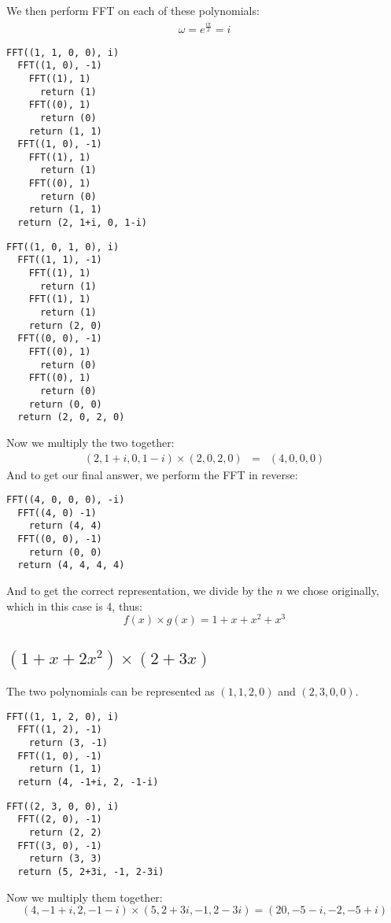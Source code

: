 \documentclass[11pt]{article}
\begin{document}
We then perform FFT on each of these polynomials:
\begin{eqnarray*}
\omega = e^{\frac{i\pi}{2}} = i
\end{eqnarray*}
\begin{verbatim}
FFT((1, 1, 0, 0), i)
  FFT((1, 0), -1)
    FFT((1), 1)
      return (1)
    FFT((0), 1)
      return (0)
    return (1, 1)
  FFT((1, 0), -1)
    FFT((1), 1)
      return (1)
    FFT((0), 1)
      return (0)
    return (1, 1)
  return (2, 1+i, 0, 1-i)
\end{verbatim}
\begin{verbatim}
FFT((1, 0, 1, 0), i)
  FFT((1, 1), -1)
    FFT((1), 1)
      return (1)
    FFT((1), 1)
      return (1)
    return (2, 0)
  FFT((0, 0), -1)
    FFT((0), 1)
      return (0)
    FFT((0), 1)
      return (0)
    return (0, 0)
  return (2, 0, 2, 0)
\end{verbatim}
Now we multiply the two together:
\begin{eqnarray*}
(2, 1+i, 0, 1-i) \times (2, 0, 2, 0) &=& (4, 0, 0, 0)
\end{eqnarray*}
And to get our final answer, we perform the FFT in reverse:
\begin{verbatim}
FFT((4, 0, 0, 0), -i)
  FFT((4, 0) -1)
    return (4, 4)
  FFT((0, 0), -1)
    return (0, 0)
  return (4, 4, 4, 4)
\end{verbatim}
And to get the correct representation, we divide by the $n$ we chose originally,
which in this case is 4, thus:
\begin{equation*}
f(x) \times g(x) = 1 + x + x^2 + x^3 
\end{equation*}

\subsection{$(1 + x + 2x^2) \times (2 + 3x)$}
The two polynomials can be represented as $(1, 1, 2, 0)$ and $(2, 3, 0, 0)$.
\begin{verbatim}
FFT((1, 1, 2, 0), i)
  FFT((1, 2), -1)
    return (3, -1)
  FFT((1, 0), -1)
    return (1, 1)
  return (4, -1+i, 2, -1-i) 
\end{verbatim}
\begin{verbatim}
FFT((2, 3, 0, 0), i)
  FFT((2, 0), -1)
    return (2, 2)
  FFT((3, 0), -1)
    return (3, 3)
  return (5, 2+3i, -1, 2-3i)
\end{verbatim}
Now we multiply them together:
\begin{equation*}
(4, -1+i, 2, -1-i) \times (5, 2+3i, -1, 2-3i) = (20, -5-i, -2, -5+i)
\end{equation*}
\end{document}

